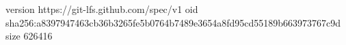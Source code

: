 version https://git-lfs.github.com/spec/v1
oid sha256:a8397947463cb36b3265fe5b0764b7489e3654a8fd95cd55189b663973767c9d
size 626416
